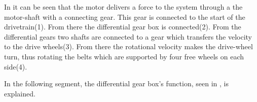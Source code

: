 In  it can be seen that the motor delivers a force to the system through a the motor-shaft with a connecting gear. This gear is connected to the start of the drivetrain(1). From there the differential gear box is connected(2). From the differential gears two shafts are connected to a gear which transfers the velocity to the drive wheels(3).
From there the rotational velocity makes the drive-wheel turn, thus rotating the belts which are supported by four free wheels on each side(4). 

In the following segment, the differential gear box's function, seen in , is explained.